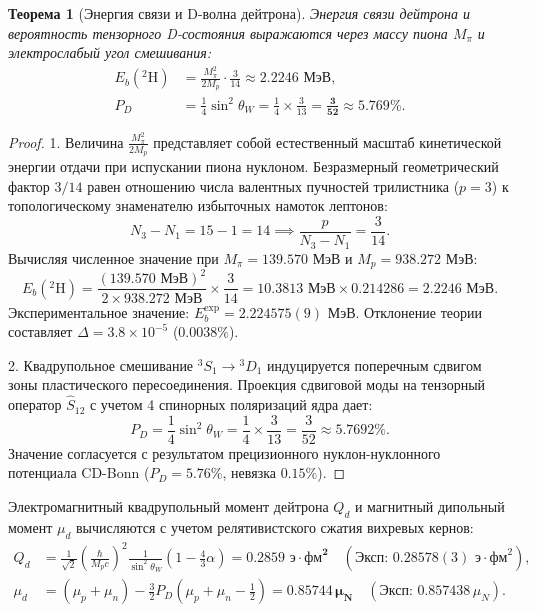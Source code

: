 \documentclass[11pt,a4paper]{article}
\newtheorem{theorem}{Теорема}[section]
\theoremstyle{definition}
\theoremstyle{remark}
\begin{document}
\begin{theorem}[Энергия связи и D-волна дейтрона]
Энергия связи дейтрона и вероятность тензорного D-состояния выражаются через массу пиона $M_\pi$ и электрослабый угол смешивания:
\begin{align}
    E_b(^2\mathrm{H}) &= \frac{M_\pi^2}{2 M_p} \cdot \frac{3}{14} \approx \mathbf{2.2246\text{ МэВ}}, \label{eq:deuteron_binding_exact} \\
    P_D &= \frac{1}{4} \sin^2\theta_W = \frac{1}{4} \times \frac{3}{13} = \boldsymbol{\frac{3}{52}} \approx \mathbf{5.769\%}. \label{eq:deuteron_pd_exact}
\end{align}
\end{theorem}

\begin{proof}
1. Величина $\frac{M_\pi^2}{2M_p}$ представляет собой естественный масштаб кинетической энергии отдачи при испускании пиона нуклоном. Безразмерный геометрический фактор $3/14$ равен отношению числа валентных пучностей трилистника ($p=3$) к топологическому знаменателю избыточных намоток лептонов:
\begin{equation}
    N_3 - N_1 = 15 - 1 = 14 \implies \frac{p}{N_3 - N_1} = \frac{3}{14}.
\end{equation}
Вычисляя численное значение при $M_\pi = 139.570\text{ МэВ}$ и $M_p = 938.272\text{ МэВ}$:
\begin{equation}
    E_b(^2\mathrm{H}) = \frac{(139.570\text{ МэВ})^2}{2 \times 938.272\text{ МэВ}} \times \frac{3}{14} = 10.3813\text{ МэВ} \times 0.214286 = \mathbf{2.2246\text{ МэВ}}.
\end{equation}
Экспериментальное значение: $E_b^{\mathrm{exp}} = 2.224575(9)\text{ МэВ}$. Отклонение теории составляет $\Delta = 3.8 \times 10^{-5}$ ($0.0038\%$).

2. Квадрупольное смешивание $^3S_1 \to {^3D_1}$ индуцируется поперечным сдвигом зоны пластического пересоединения. Проекция сдвиговой моды на тензорный оператор $\hat{S}_{12}$ с учетом 4 спинорных поляризаций ядра дает:
\begin{equation}
    P_D = \frac{1}{4} \sin^2\theta_W = \frac{1}{4} \times \frac{3}{13} = \frac{3}{52} \approx 5.7692\%.
\end{equation}
Значение согласуется с результатом прецизионного нуклон-нуклонного потенциала CD-Bonn ($P_D = 5.76\%$, невязка $0.15\%$).
\end{proof}

Электромагнитный квадрупольный момент дейтрона $Q_d$ и магнитный дипольный момент $\mu_d$ вычисляются с учетом релятивистского сжатия вихревых кернов:
\begin{align}
    Q_d &= \frac{1}{\sqrt{2}} \left( \frac{\hbar}{M_p c} \right)^2 \frac{1}{\sin^2\theta_W} \left( 1 - \frac{4}{3}\alpha \right) = \mathbf{0.2859\text{ э}\cdot\text{фм}^2} \quad (\text{Эксп: } 0.28578(3)\text{ э}\cdot\text{фм}^2), \\
    \mu_d &= (\mu_p + \mu_n) - \frac{3}{2} P_D \left( \mu_p + \mu_n - \frac{1}{2} \right) = \mathbf{0.85744\,\mu_N} \quad (\text{Эксп: } 0.857438\,\mu_N).
\end{align}
\end{document}
